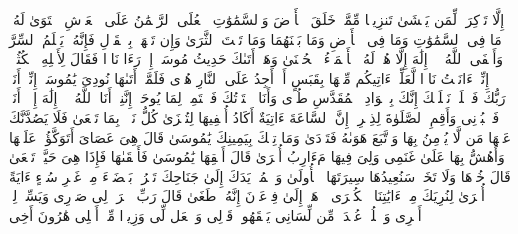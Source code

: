 \startbuffer[\q:20:3]
إِلَّا تَذۡكِرَةࣰ لِّمَن یَخۡشَىٰ%
\stopbuffer%
\startbuffer[\q:20:4]
تَنزِیلࣰا مِّمَّنۡ خَلَقَ ٱلۡأَرۡضَ وَٱلسَّمَٰوَٰتِ ٱلۡعُلَى%
\stopbuffer%
\startbuffer[\q:20:5]
ٱلرَّحۡمَٰنُ عَلَى ٱلۡعَرۡشِ ٱسۡتَوَىٰ%
\stopbuffer%
\startbuffer[\q:20:6]
لَهُۥ مَا فِی ٱلسَّمَٰوَٰتِ وَمَا فِی ٱلۡأَرۡضِ وَمَا بَیۡنَهُمَا وَمَا تَحۡتَ ٱلثَّرَىٰ%
\stopbuffer%
\startbuffer[\q:20:7]
وَإِن تَجۡهَرۡ بِٱلۡقَوۡلِ فَإِنَّهُۥ یَعۡلَمُ ٱلسِّرَّ وَأَخۡفَى%
\stopbuffer%
\startbuffer[\q:20:8]
ٱللَّهُ لَاۤ إِلَٰهَ إِلَّا هُوَۖ لَهُ ٱلۡأَسۡمَاۤءُ ٱلۡحُسۡنَىٰ%
\stopbuffer%
\startbuffer[\q:20:9]
وَهَلۡ أَتَىٰكَ حَدِیثُ مُوسَىٰۤ%
\stopbuffer%
\startbuffer[\q:20:10]
إِذۡ رَءَا نَارࣰا فَقَالَ لِأَهۡلِهِ ٱمۡكُثُوۤا۟ إِنِّیۤ ءَانَسۡتُ نَارࣰا لَّعَلِّیۤ ءَاتِیكُم مِّنۡهَا بِقَبَسٍ أَوۡ أَجِدُ عَلَى ٱلنَّارِ هُدࣰى%
\stopbuffer%
\startbuffer[\q:20:11]
فَلَمَّاۤ أَتَىٰهَا نُودِیَ یَٰمُوسَىٰۤ%
\stopbuffer%
\startbuffer[\q:20:12]
إِنِّیۤ أَنَا۠ رَبُّكَ فَٱخۡلَعۡ نَعۡلَیۡكَ إِنَّكَ بِٱلۡوَادِ ٱلۡمُقَدَّسِ طُوࣰى%
\stopbuffer%
\startbuffer[\q:20:13]
وَأَنَا ٱخۡتَرۡتُكَ فَٱسۡتَمِعۡ لِمَا یُوحَىٰۤ%
\stopbuffer%
\startbuffer[\q:20:14]
إِنَّنِیۤ أَنَا ٱللَّهُ لَاۤ إِلَٰهَ إِلَّاۤ أَنَا۠ فَٱعۡبُدۡنِی وَأَقِمِ ٱلصَّلَوٰةَ لِذِكۡرِیۤ%
\stopbuffer%
\startbuffer[\q:20:15]
إِنَّ ٱلسَّاعَةَ ءَاتِیَةٌ أَكَادُ أُخۡفِیهَا لِتُجۡزَىٰ كُلُّ نَفۡسِۭ بِمَا تَسۡعَىٰ%
\stopbuffer%
\startbuffer[\q:20:16]
فَلَا یَصُدَّنَّكَ عَنۡهَا مَن لَّا یُؤۡمِنُ بِهَا وَٱتَّبَعَ هَوَىٰهُ فَتَرۡدَىٰ%
\stopbuffer%
\startbuffer[\q:20:17]
وَمَا تِلۡكَ بِیَمِینِكَ یَٰمُوسَىٰ%
\stopbuffer%
\startbuffer[\q:20:18]
قَالَ هِیَ عَصَایَ أَتَوَكَّؤُا۟ عَلَیۡهَا وَأَهُشُّ بِهَا عَلَىٰ غَنَمِی وَلِیَ فِیهَا مَءَارِبُ أُخۡرَىٰ%
\stopbuffer%
\startbuffer[\q:20:19]
قَالَ أَلۡقِهَا یَٰمُوسَىٰ%
\stopbuffer%
\startbuffer[\q:20:20]
فَأَلۡقَىٰهَا فَإِذَا هِیَ حَیَّةࣱ تَسۡعَىٰ%
\stopbuffer%
\startbuffer[\q:20:21]
قَالَ خُذۡهَا وَلَا تَخَفۡۖ سَنُعِیدُهَا سِیرَتَهَا ٱلۡأُولَىٰ%
\stopbuffer%
\startbuffer[\q:20:22]
وَٱضۡمُمۡ یَدَكَ إِلَىٰ جَنَاحِكَ تَخۡرُجۡ بَیۡضَاۤءَ مِنۡ غَیۡرِ سُوۤءٍ ءَایَةً أُخۡرَىٰ%
\stopbuffer%
\startbuffer[\q:20:23]
لِنُرِیَكَ مِنۡ ءَایَٰتِنَا ٱلۡكُبۡرَى%
\stopbuffer%
\startbuffer[\q:20:24]
ٱذۡهَبۡ إِلَىٰ فِرۡعَوۡنَ إِنَّهُۥ طَغَىٰ%
\stopbuffer%
\startbuffer[\q:20:25]
قَالَ رَبِّ ٱشۡرَحۡ لِی صَدۡرِی%
\stopbuffer%
\startbuffer[\q:20:26]
وَیَسِّرۡ لِیۤ أَمۡرِی%
\stopbuffer%
\startbuffer[\q:20:27]
وَٱحۡلُلۡ عُقۡدَةࣰ مِّن لِّسَانِی%
\stopbuffer%
\startbuffer[\q:20:28]
یَفۡقَهُوا۟ قَوۡلِی%
\stopbuffer%
\startbuffer[\q:20:29]
وَٱجۡعَل لِّی وَزِیرࣰا مِّنۡ أَهۡلِی%
\stopbuffer%
\startbuffer[\q:20:30]
هَٰرُونَ أَخِی%
\stopbuffer%
